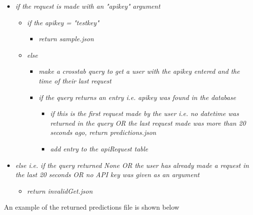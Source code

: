             \vspace{3mm}\linebreak
            \begin{itemize}
                \item \textit{if the request is made with an "apikey" argument}
                \begin{itemize}
                    \item \textit{if the apikey = "testkey"}
                    \begin{itemize}
                        \item \textit{return sample.json}
                    \end{itemize}
                    \item \textit{else}
                    \begin{itemize}
                        \item \textit{make a crosstab query to get a user with the apikey entered and the time of their last request}
                        \item \textit{if the query returns an entry i.e. apikey was found in the database}
                        \begin{itemize}
                            \item \textit{if this is the first request made by the user i.e. no datetime was returned in the query OR the last request made was more than 20 seconds ago, return predictions.json}
                            \item \textit{add entry to the apiRequest table}
                        \end{itemize}
                    \end{itemize}
                \end{itemize}
                \item \textit{else i.e. if the query returned None OR the user has already made a request in the last 20 seconds OR no API key was given as an argument}
                
                \begin{itemize}
                \item \textit{return invalidGet.json}
                \end{itemize}            
            \end{itemize}

            \vspace{3mm}
            An example of the returned predictions file is shown below

